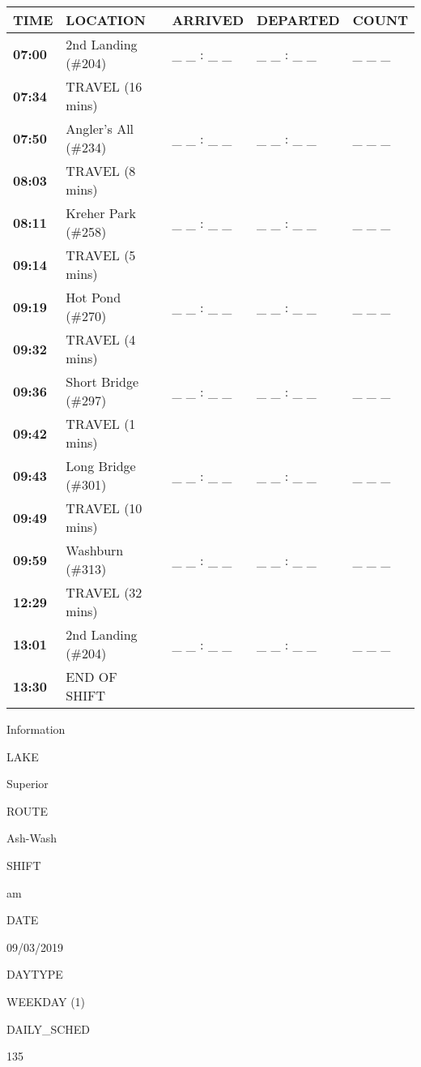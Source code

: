\documentclass[]{article}
\begin{document}
\begin{tabular}{>{\bfseries}lllll}
\toprule
\textbf{TIME} & \textbf{LOCATION} & \textbf{ARRIVED} & \textbf{DEPARTED} & \textbf{COUNT}\\
\midrule
07:00 & 2nd Landing (\#204) & \_ \_ : \_ \_ & \_ \_ : \_ \_ & \_ \_ \_\\
07:34 & TRAVEL (16 mins) &  &  & \\
07:50 & Angler's All (\#234) & \_ \_ : \_ \_ & \_ \_ : \_ \_ & \_ \_ \_\\
08:03 & TRAVEL (8 mins) &  &  & \\
08:11 & Kreher Park (\#258) & \_ \_ : \_ \_ & \_ \_ : \_ \_ & \_ \_ \_\\
09:14 & TRAVEL (5 mins) &  &  & \\
09:19 & Hot Pond (\#270) & \_ \_ : \_ \_ & \_ \_ : \_ \_ & \_ \_ \_\\
09:32 & TRAVEL (4 mins) &  &  & \\
09:36 & Short Bridge (\#297) & \_ \_ : \_ \_ & \_ \_ : \_ \_ & \_ \_ \_\\
09:42 & TRAVEL (1 mins) &  &  & \\
09:43 & Long Bridge (\#301) & \_ \_ : \_ \_ & \_ \_ : \_ \_ & \_ \_ \_\\
09:49 & TRAVEL (10 mins) &  &  & \\
09:59 & Washburn (\#313) & \_ \_ : \_ \_ & \_ \_ : \_ \_ & \_ \_ \_\\
12:29 & TRAVEL (32 mins) &  &  & \\
13:01 & 2nd Landing (\#204) & \_ \_ : \_ \_ & \_ \_ : \_ \_ & \_ \_ \_\\
13:30 & END OF SHIFT &  &  & \\
\bottomrule
\end{tabular}\newpage

Information

LAKE

Superior

ROUTE

Ash-Wash

SHIFT

am

DATE

09/03/2019

DAYTYPE

WEEKDAY (1)

DAILY\_SCHED

135

\vspace{24pt}
\end{document}
